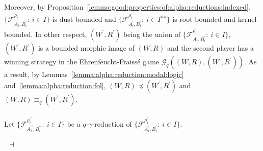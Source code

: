 \documentclass[draft]{article}
\newenvironment{proof}{{\bf Proof:}}{~$\dashv$\\}
\begin{document}
\begin{proof}
%
%
%
%
%
%
%
%
%
%
%
%
Moreover, by Proposition~\ref{lemma:good:properties:of:alpha:reductions:indexed}, $\{{\mathcal F}_{A_{i}^{\prime},B_{i}^{\prime}}^{\rho_{i}^{\prime}}:\ i{\in}I\}$ is dust-bounded and $\{{\mathcal F}_{A_{i}^{\prime},B_{i}^{\prime}}^{\rho_{i}^{\prime}}:\ i{\in}I^{ns}\}$ is root-bounded and kernel-bounded.
In other respect, $(W^{\prime},R^{\prime})$ being the union of $\{{\mathcal F}_{A_{i}^{\prime},B_{i}^{\prime}}^{\rho_{i}^{\prime}}:\ i{\in}I\}$, $(W^{\prime},R^{\prime})$ is a bounded morphic image of $(W,R)$ and the second player has a winning strategy in the Ehrenfeucht-Fra\"\i ss\'e game ${\mathcal G}_{q}((W,R),(W^{\prime},R^{\prime}))$.
As a result, by Lemmas~\ref{lemma:alpha:reduction:modal:logic} and~\ref{lemma:alpha:reduction:fol}, $(W,R){\preceq}(W^{\prime},R^{\prime})$ and $(W,R){\equiv_{q}}(W^{\prime},R^{\prime})$.
%
%
\\
\\
%
%
Let $\{{\mathcal F}_{A_{i}^{\prime\prime},B_{i}^{\prime\prime}}^{\rho_{i}^{\prime\prime}}:\ i{\in}I\}$ be a $q$-$\gamma$-reduction of $\{{\mathcal F}_{A_{i}^{\prime},B_{i}^{\prime}}^{\rho_{i}^{\prime}}:\ i{\in}I\}$.

\end{proof}
\end{document}

